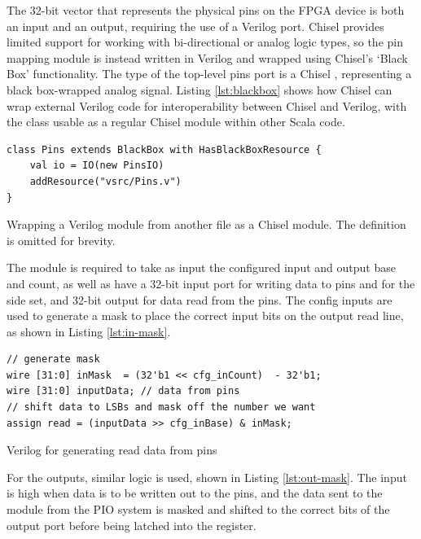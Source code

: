 The 32-bit vector that represents the physical pins on the FPGA device is both an input and an output, requiring the use of a Verilog  port. Chisel provides limited support for working with bi-directional or analog logic types, so the pin mapping module is instead written in Verilog and wrapped using Chisel's `Black Box' functionality. The type of the top-level pins port is a Chisel , representing a black box-wrapped analog signal. Listing \ref{lst:blackbox} shows how Chisel can wrap external Verilog code for interoperability between Chisel and Verilog, with the  class usable as a regular Chisel module within other Scala code.

\begin{listing}[h!]
    \centering
    \vspace{0.5cm}
    \begin{verbatim}
class Pins extends BlackBox with HasBlackBoxResource {
    val io = IO(new PinsIO)
    addResource("vsrc/Pins.v")
}
    \end{verbatim}
    \caption{Wrapping a Verilog module from another file as a Chisel module. The  definition is omitted for brevity.}
    \label{lst:blackbox}
\end{listing}

The module is required to take as input the configured input and output base and count, as well as have a 32-bit input port for writing data to pins and for the side set, and 32-bit output for data read from the pins. The config inputs are used to generate a mask to place the correct input bits on the output read line, as shown in Listing \ref{lst:in-mask}.

\begin{listing}[h!]
    \vspace{0.5cm}
    \begin{verbatim}
// generate mask
wire [31:0] inMask  = (32'b1 << cfg_inCount)  - 32'b1; 
wire [31:0] inputData; // data from pins
// shift data to LSBs and mask off the number we want
assign read = (inputData >> cfg_inBase) & inMask; 
    \end{verbatim}
    \caption{Verilog for generating read data from pins}
    \label{lst:in-mask}
\end{listing}

For the outputs, similar logic is used, shown in Listing \ref{lst:out-mask}. The  input is high when data is to be written out to the pins, and the data sent to the module from the PIO system is masked and shifted to the correct bits of the output port before being latched into the register.


